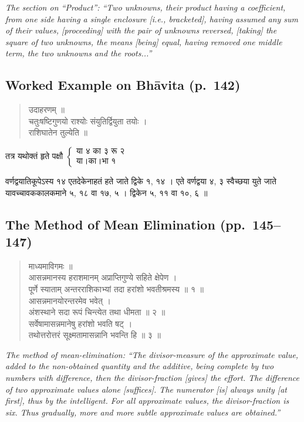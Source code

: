 \documentclass[11pt,a4paper]{article}
\newcommand{\cnote}[1]{\textcolor{notecolor}{\textit{#1}}}
\newcommand{\dev}[1]{{\devanagarifont #1}}
\newenvironment{sanskritverse}{%
  \begin{verse}
}{%
  \end{verse}
}
\begin{document}
\cnote{The section on ``Product'': ``Two unknowns, their product having a coefficient, from one side having a single enclosure [i.e., bracketed], having assumed any sum of their values, [proceeding] with the pair of unknowns reversed, [taking] the square of two unknowns, the means [being] equal, having removed one middle term, the two unknowns and the roots...''}

\subsection*{Worked Example on Bhāvita (p.\ 142)}

\begin{sanskritverse}
\dev{%
उदाहरणम् ॥\\[0.3em]
चतुःषष्टिगुणयो राश्योः संयुतिर्द्वियुता तयोः ।\\
राशिघातेन तुल्येति ॥}
\end{sanskritverse}

\dev{%
तत्र यथोक्तं हृते पक्षौ $\left\{ \begin{array}{l} \text{या ४ का ३ रू २} \\ \text{या।का।भा १} \end{array} \right.$}

\dev{%
वर्णद्वयातिकूपेऽस्य १४ एतदेकेनाहतं हते जाते द्विके १, १४ । एते वर्णद्वया ४, ३ स्वैच्छया युते जाते यावच्चावककालकमाने ५, १८ वा १७, ५ । द्विकेन ५, ११ वा १०, ६ ॥}

\subsection{The Method of Mean Elimination (pp.\ 145--147)}

\begin{sanskritverse}
\dev{%
माध्यमाविगमः ॥\\[0.5em]
आसन्नमानस्य हराशमानम् अप्राप्तिगुण्ये सहिते क्षेपेण ।\\
पूर्णे स्याताम् अन्तरराशिकाभ्यां तदा हरांशो भवतीश्रमस्य ॥ १ ॥\\[0.5em]
आसन्नमानयोरन्तरमेव भवेत् ।\\
अंशस्थाने सदा रूपं चिन्त्येत तथा धीमता ॥ २ ॥\\
सर्वेषामासन्नमानेषु हरांशो भवति षट् ।\\
तथोत्तरोत्तरं सूक्ष्मतामासन्नानि भवन्ति हि ॥ ३ ॥}
\end{sanskritverse}

\cnote{The method of mean-elimination: ``The divisor-measure of the approximate value, added to the non-obtained quantity and the additive, being complete by two numbers with difference, then the divisor-fraction [gives] the effort. The difference of two approximate values alone [suffices]. The numerator [is] always unity [at first], thus by the intelligent. For all approximate values, the divisor-fraction is six. Thus gradually, more and more subtle approximate values are obtained.''}
\end{document}
